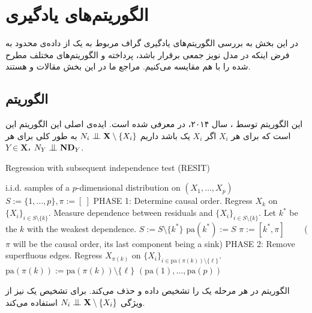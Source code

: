 \documentclass{article}
\begin{document}
\section{الگوریتم‌های یادگیری}

در این بخش به بررسی الگوریتم‌های یادگیری گراف مربوط به یک 
از داده‌ی محدود به فرض اینکه  در
 مدل نویز جمعی برقرار باشد، پرداخته و الگوریتم‌های مختلف مطرح شده را با هم مقایسه می‌کنیم. مراجع ما در این بخش مقالات 
 \cite{continous}
  و 
  \cite{nowzohour}
  هستند.
\subsection{الگوریتم 
}
این الگوریتم توسط 
،
سال ۲۰۱۴، در
\cite{continous}
  معرفی شده است. ایده‌ی اصلی این الگوریتم این است که برای هر $X_i$ اگر $X_i$ یک
باشد داریم
$N_i \bigCI \mathbf{X} \setminus \{X_i\}$
به طور کلی برای هر 
$Y \in \mathbf{X}$،
$N_Y \bigCI \mathbf{ND}_Y$.

\begin{latin}	
\begin{algorithm}[h]
	\caption{Regression with subsequent independence test (RESIT)}
	\label{alg:icml}
	\begin{algorithmic}[1]
		 i.i.d. samples of a $p$-dimensional distribution on $(X_1, \ldots, X_p)$ \vspace{0.0cm}
		\STATE $S:=\{1, \ldots, p\}, \pi := [\ ]$ \vspace{0.15cm}
		\STATE PHASE 1: Determine causal order.
		\REPEAT
		\STATE Regress $X_k$ on $\{X_i\}_{i \in S \setminus \{k\}}$.%
		\STATE Measure dependence between residuals and $\{X_i\}_{i \in S \setminus \{k\}}$.  
		\ENDFOR
		\STATE Let $k^*$ be the $k$ with the weakest dependence.
		\STATE $S:=S \setminus \{k^*\}$
		\STATE $\mathrm{pa}(k^*):=S$
		\STATE $\pi := [k^*, \pi]\qquad $  ($\pi$ will be the causal order, its last component being a sink)
		 \vspace{0.15cm}
		\STATE PHASE 2: Remove superfluous edges.
		\STATE Regress $X_{\pi(k)}$ on $\{X_i\}_{i \in \mathrm{pa}(\pi(k)) \setminus \{\ell\}}$.
		\STATE $\mathrm{pa}(\pi(k)) := \mathrm{pa}(\pi(k)) \setminus \{\ell \}$ 
		\ENDIF
		\ENDFOR
		\ENDFOR
		 $(\mathrm{pa}(1), \ldots, \mathrm{pa}(p))$
	\end{algorithmic}
\end{algorithm}
\end{latin}	
	الگوریتم 
	در هر مرحله یک 
	را تشخیص داده و حذف می‌کند. برای تشخیص یک 
	نیز از ويژگی $N_i \bigCI \mathbf{X} \setminus \{X_i\}$ استفاده می‌کند. 
	
\end{document}
